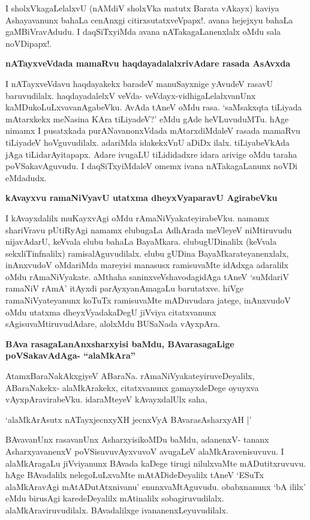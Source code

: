 I sholxVkagaLelalxvU (nAMdiV sholxVka matutx Barata vAkayx) kaviya Ashayavanunx bahaLa cenAnxgi citirxsutatxveVpapx!. avana hejejxyu bahaLa gaMBiVravAdudu. I daqSiTxyiMda avana nATakagaLanenxlalx oMdu sala noVDipapx!.

\noindent
{\bf\large{nATayxveVdada mamaRvu haqdayadalalxrivAdare rasada AsAvxda}}\label{page244}

I nATayxveVdavu haqdayakekx baradeV manuSayxnige yAvudeV rasavU baruvudilalx. haqdayadalelxV veVda- veVdayx-vidhigaLelalxvanUnx kaMDukoLuLxvavanAgabeVku. AvAda tAneV oMdu rasa. `saMsakxqta tiLiyada mAtarxkekx meNasina KAra tiLiyadeV?' eMdu gAde heVLuvuduMTu. hAge nimamx I pusatxkada purANavanonxVdada mAtarxdiMdaleV rasada mamaRvu tiLiyadeV hoVguvudilalx. adariMda idakekxVnU aDiDx ilalx. tiLiyabeVkAda jAga tiLidarAyitapapx. Adare ivugaLU tiLididadxre idara arivige oMdu taraha poVSakavAguvudu. I daqSiTxyiMdaleV omemx ivana nATakagaLanunx noVDi eMdadudx.

\noindent
{\bf\large{kAvayxvu ramaNiVyavU utatxma dheyxVyaparavU AgirabeVku}}\label{page244}

I kAvayxdalilx muKayxvAgi oMdu rAmaNiVyakateyirabeVku. namamx shariVravu pUtiRyAgi namamx elubugaLa AdhArada meVleyeV niMtiruvudu nijavAdarU, keVvala elubu bahaLa BayaMkara. elubugUDinalilx (keVvala sekxliTinfnalilx) ramisalAguvudilalx. elubu gUDina BayaMkarateyanenxlalx, inAnxvudoV oMdariMda mareyisi manasusx ramisuvaMte idAdxga adaralilx oMdu rAmaNiVyakate. aMthaha saninxveVshavodagidAga tAneV `suMdariV ramaNiV rAmA' itAyxdi parAyxyanAmagaLu barutatxve. hiVge ramaNiVyateyanunx koTuTx ramisuvaMte mADuvudara jatege, inAnxvudoV oMdu utatxma dheyxVyadakaDegU jiVviya citatxvanunx sAgisuvaMtiruvudAdare, alolxMdu BUSaNada vAyxpAra.

\noindent
{\bf\large{BAva rasagaLanAnxsharxyisi baMdu, BAvarasagaLige poVSakavAdAga- ``alaMkAra''}}\label{page245}

AtamxBaraNakAkxgiyeV ABaraNa. rAmaNiVyakateyiruveDeyalilx, ABaraNakekx- alaMkArakekx, citatxvanunx gamayxdeDege oyuyxva vAyxpAravirabeVku. idaraMteyeV kAvayxdalUlx saha, 

\begin{shloka}
`alaMkArAsutx nATayxjecnxyXH jecnxVyA BAvarasAsharxyAH |'\label{245}
\end{shloka}

BAvavanUnx rasavanUnx AsharxyisikoMDu baMdu, adanenxV- tananx AsharxyavanenxV poVSisuvuvAyxvuvoV avugaLeV alaMkAravenisuvuvu. I alaMkAragaLu jiVviyanunx BAvada kaDege tirugi nilulxvaMte mADutitxruvuvu. hAge BAvadalilx nelegoLuLxvaMte mAtADideDeyalilx tAneV `ESuTx alaMkAravAgi mAtADutAtxnivanu' enunxvaMtAguvudu. obabxnanunx `bA ililx' eMdu birusAgi karedeDeyalilx mAtinalilx sobagiruvudilalx. alaMkAraviruvudilalx. BAvadalilxge ivananenxLeyuvudilalx.

